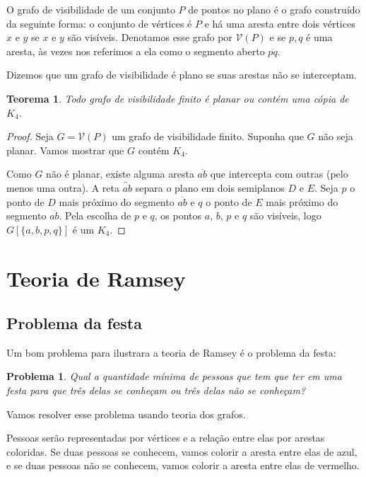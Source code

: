\documentclass[a4paper]{book}
\newtheorem{problem}{Problema}
\newtheorem{teorema}{Teorema}
\begin{document}
O grafo de visibilidade de um conjunto $P$ de pontos no plano é o grafo construído da seguinte forma: o conjunto de vértices é $P$ e há uma aresta entre dois vértices $x$ e $y$ se $x$ e $y$ são visíveis. Denotamos esse grafo por $\mathcal V(P)$ e se ${p,q}$ é uma aresta, às vezes nos referimos a ela como o segmento aberto $\overline{pq}$.

Dizemos que um grafo de visibilidade é plano se suas arestas não se interceptam.

\begin{teorema}\cite{visibility}\label{planork4}
    Todo grafo de visibilidade finito é planar ou contém uma cópia de $K_4$.
\end{teorema}
\begin{proof}
    Seja $G=\mathcal V(P)$ um grafo de visibilidade finito. Suponha que $G$ não seja planar. Vamos mostrar que $G$ contém $K_4$.

    Como $G$ não é planar, existe alguma aresta $\overline{ab}$ que intercepta com outras (pelo menos uma outra). A reta $\overleftrightarrow{ab}$ separa o plano em dois semiplanos $D$ e $E$. Seja $p$ o ponto de $D$ mais próximo do segmento $\overline{ab}$ e $q$ o ponto de $E$ mais próximo do segmento $\overline{ab}$. Pela escolha de $p$ e $q$, os pontos $a$, $b$, $p$ e $q$ são visíveis, logo $G[\{a,b,p,q\}]$ é um $K_4$.
\end{proof}

\section {Teoria de Ramsey}

\subsection {Problema da festa}
Um bom problema para ilustrara a teoria de Ramsey é o problema da festa:

\begin{problem}
    Qual a quantidade mínima de pessoas que tem que ter em uma festa para que três delas se conheçam ou três delas não se conheçam?
\end{problem}

Vamos resolver esse problema usando teoria dos grafos.

Pessoas serão representadas por vértices e a relação entre elas por arestas coloridas. Se duas pessoas se conhecem, vamos colorir a aresta entre elas de azul, e se duas pessoas não se conhecem, vamos colorir a aresta entre elas de vermelho.
\end{document}
